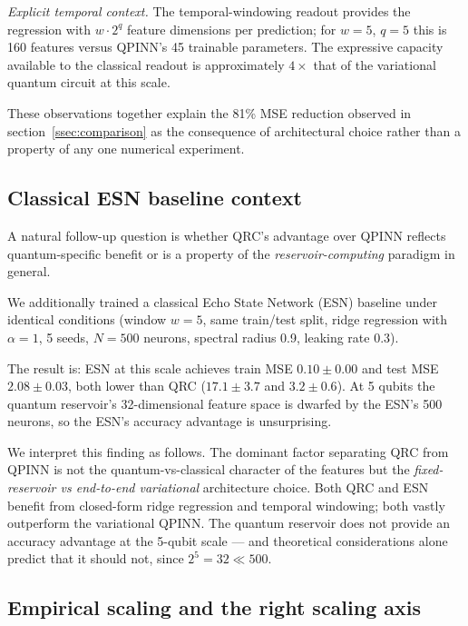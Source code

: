 \documentclass[a4paper,12pt]{iopart}
\begin{document}
\textit{Explicit temporal context.} The temporal-windowing readout
provides the regression with $w \cdot 2^q$ feature dimensions per
prediction; for $w = 5$, $q = 5$ this is 160 features versus QPINN's
45 trainable parameters. The expressive capacity available to the
classical readout is approximately $4 \times$ that of the variational
quantum circuit at this scale.

These observations together explain the 81\% MSE reduction observed
in section~\ref{ssec:comparison} as the consequence of architectural
choice rather than a property of any one numerical experiment.

\subsection{Classical ESN baseline context}
\label{ssec:esn-context}

A natural follow-up question is whether QRC's advantage over QPINN
reflects quantum-specific benefit or is a property of the
\emph{reservoir-computing} paradigm in general.

We additionally trained a classical Echo State Network (ESN) baseline
under identical conditions (window $w = 5$, same train/test split,
ridge regression with $\alpha = 1$, 5 seeds, $N = 500$ neurons,
spectral radius 0.9, leaking rate 0.3).

The result is: ESN at this scale achieves train MSE $0.10 \pm 0.00$
and test MSE $2.08 \pm 0.03$, both lower than QRC ($17.1 \pm 3.7$ and
$3.2 \pm 0.6$). At 5 qubits the quantum reservoir's 32-dimensional
feature space is dwarfed by the ESN's 500 neurons, so the ESN's
accuracy advantage is unsurprising.

We interpret this finding as follows. The dominant factor separating
QRC from QPINN is not the quantum-vs-classical character of the
features but the \emph{fixed-reservoir vs end-to-end variational}
architecture choice. Both QRC and ESN benefit from closed-form ridge
regression and temporal windowing; both vastly outperform the
variational QPINN. The quantum reservoir does not provide an accuracy
advantage at the 5-qubit scale --- and theoretical considerations
alone predict that it should not, since $2^5 = 32 \ll 500$.

\subsection{Empirical scaling and the right scaling axis}
\label{ssec:scaling-crossover}
\end{document}
